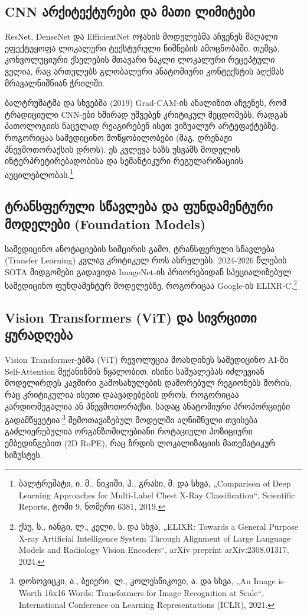 \documentclass[12pt,a4paper,oneside]{report}
\begin{document}
\subsection{CNN არქიტექტურები და მათი ლიმიტები}
ResNet, DenseNet და EfficientNet ოჯახის მოდელებმა აჩვენეს მაღალი ეფექტუყოფა ლოკალური ტექსტურული ნიშნების ამოცნობაში. თუმცა, კონვოლუციური ქსელების მთავარი ნაკლი ლოკალური რეცეპტული ველია, რაც ართულებს გლობალური ანატომიური კონტექსტის აღქმას მრავალნიშნიან ჭრილში.

ბალტრუშატმა და სხვებმა (2019) Grad-CAM-ის ანალიზით აჩვენეს, რომ ტრადიციული CNN-ები ხშირად უშვებენ კრიტიკულ შეცდომებს, რადგან პათოლოგიის ნაცვლად რეაგირებენ ისეთ ვიზუალურ არტეფაქტებზე, როგორიცაა სამედიცინო მოწყობილობები (მაგ. დრენაჟი პნევმოთორაქსის დროს). ეს კვლევა ხაზს უსვამს მოდელის ინტერპრეტირებადობისა და სემანტიკური რეგულარიზაციის აუცილებლობას.\footnote{ბალტრუშატი, ი. მ., ნიკიში, ჰ., გრასი, მ. და სხვა, „Comparison of Deep Learning Approaches for Multi-Label Chest X-Ray Classification“, Scientific Reports, ტომი 9, ნომერი 6381, 2019.}

\subsection{ტრანსფერული სწავლება და ფუნდამენტური მოდელები (Foundation Models)}
სამედიცინო ანოტაციების სიმცირის გამო, ტრანსფერული სწავლება (Transfer Learning) კვლავ კრიტიკულ როს ასრულებს. 2024-2026 წლების SOTA მიდგომები გადავიდა ImageNet-ის პრიორებიდან სპეციალიზებულ სამედიცინო ფუნდამენტურ მოდელებზე, როგორიცაა Google-ის ELIXR-C.\footnote{ქსუ, ს., იანგი, ლ., კელი, ს. და სხვა, „ELIXR: Towards a General Purpose X-ray Artificial Intelligence System Through Alignment of Large Language Models and Radiology Vision Encoders“, arXiv preprint arXiv:2308.01317, 2024.}

\subsection{Vision Transformers (ViT) და სივრცითი ყურადღება}
Vision Transformer-ებმა (ViT) რევოლუცია მოახდინეს სამედიცინო AI-ში Self-Attention მექანიზმის წყალობით. ისინი საშუალებას იძლევიან მოდელირდეს კავშირი გამოსახულების დაშორებულ რეგიონებს შორის, რაც კრიტიკულია ისეთი დაავადებების დროს, როგორიცაა კარდიომეგალია ან პნევმოთორაქსი, სადაც ანატომიური პროპორციები გადამწყვეტია.\footnote{დოსოვიცკი, ა., ბეიერი, ლ., კოლესნიკოვი, ა. და სხვა, „An Image is Worth 16x16 Words: Transformers for Image Recognition at Scale“, International Conference on Learning Representations (ICLR), 2021.} შემოთავაზებულ მოდელში აღნიშნული თვისება გაძლიერებულია ორგანზომილებიანი როტაციული პოზიციური ემბედინგებით (2D RoPE), რაც ზრდის ლოკალიზაციის მათემატიკურ სიზუსტეს.
\end{document}
